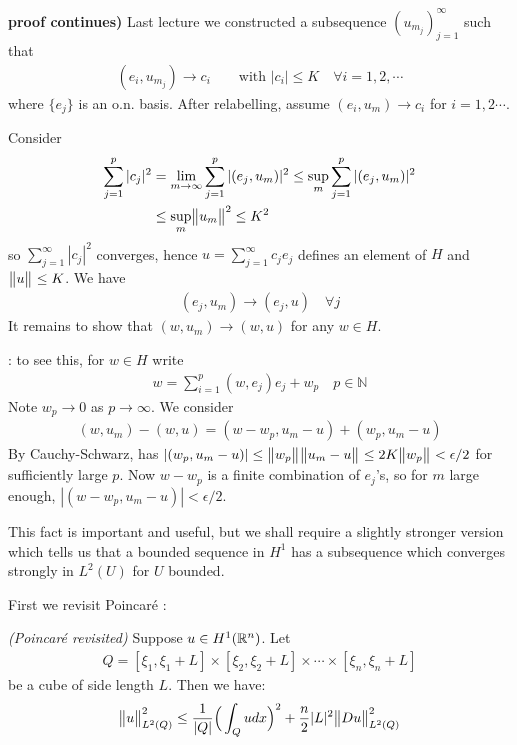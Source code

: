 \documentclass[12pt,a4paper]{report}
\newenvironment{proof}
{\begin{changemargin}{1cm}{0.5cm} 
	}%
	{\end{changemargin}
}
\newenvironment{subproof}
{\begin{changemargin}{0.5cm}{0.5cm} 
	}%
	{\end{changemargin}
}
\begin{document}
\begin{proof}
\textbf{proof continues)} Last lecture we constructed a subsequence $(u_{m_j})_{j=1}^{\infty}$ such that
\begin{align*}
(e_i, u_{m_j}) \rightarrow c_i \quad\quad \text{with } |c_i| \leq K \quad \forall i=1,2,\cdots
\end{align*}
where $\{e_j \}$ is an o.n. basis. After relabelling, assume $(e_i ,u_m) \rightarrow c_i$ for $i=1,2\cdots$.
\s

Consider 
\begin{align*}
\sum_{j=1}^p |c_j|^2 &= \lim_{m\rightarrow \infty} \sum_{j=1}^p |(e_j, u_m)|^2 \leq \sup_{m} \sum_{j=1}^p |(e_j, u_m)|^2 \\
&\leq  \sup_{m} \bigl\lVert u_m\bigr\rVert_{}^2 \leq K^2
\end{align*}
so $\sum_{j=1}^{\infty} |c_j|^2$ converges, hence $u= \sum_{j=1}^{\infty} c_j e_j$ defines an element of $H$ and $\bigl\lVert u\bigr\rVert_{} \leq K$. We have
\begin{align*}
(e_j, u_m) \rightarrow (e_j, u) \quad \forall j
\end{align*}
It remains to show that $(w, u_m) \rightarrow (w,u)$ for any $w\in H$.
\begin{subproof}
: to see this, for $w\in H$ write
\begin{align*}
w= \sum_{i=1}^p (w,e_j) e_j + w_p \quad p\in \mathbb{N}
\end{align*}
Note $w_p \rightarrow 0$ as $p\rightarrow \infty$. We consider
\begin{align*}
(w,u_m) - (w,u) = (w-w_p, u_m -u) + (w_p, u_m-u)
\end{align*}
By Cauchy-Schwarz, has $|(w_p, u_m -u)| \leq \bigl\lVert w_p\bigr\rVert_{} \bigl\lVert u_m -u\bigr\rVert_{} \leq 2K \bigl\lVert w_p\bigr\rVert_{} < \epsilon/2$ for sufficiently large $p$. Now $w-w_p$ is a finite combination of $e_j$'s, so for $m$ large enough, $|(w-w_p, u_m -u)| < \epsilon/2$.
\end{subproof}

\eop
\end{proof}

This fact is important and useful, but we shall require a slightly stronger version which tells us that a bounded sequence in $H^1$ has a subsequence which converges strongly in $L^2(U)$ for $U$ bounded.
\s

First we revisit Poincar\'{e} :
\s

\lem \emph{(Poincar\'{e} revisited)} Suppose $u\in H^1(\mathbb{R}^n)$. Let
\begin{align*}
Q = [\xi_1, \xi_1 +L] \times [\xi_2, \xi_2 +L] \times \cdots \times [\xi_n, \xi_n +L]
\end{align*}
be a cube of side length $L$. Then we have:
\begin{align*}
\bigl\lVert u\bigr\rVert_{L^2(Q)}^2 \leq \frac{1}{|Q|} \Big( \int_Q udx \Big)^2 + \frac{n}{2} |L|^2 \bigl\lVert Du\bigr\rVert_{L^2(Q)}^2
\end{align*}
\s
\end{document}
